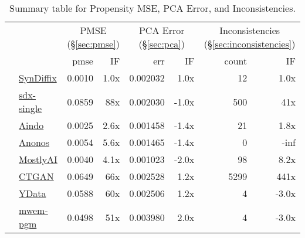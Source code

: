 \begin{table}
    \centering
    \caption{Summary table for Propensity MSE, PCA Error, and Inconsistencies.}
    \label{tab:pmse}
    \small
    \begin{tabular}{llr@{\hskip 6pt}r@{\hskip 14pt}r@{\hskip 6pt}r@{\hskip 14pt}rr}
        \toprule
          &   & \multicolumn{2}{c}{PMSE (\S\ref{sec:pmse})} & \multicolumn{2}{c}{PCA Error (\S\ref{sec:pca})} & \multicolumn{2}{c}{Inconsistencies (\S\ref{sec:inconsistencies})} \\
        
 & & pmse & IF & err & IF & count & IF \\
\midrule
        \cellcolor{blue} & \href{https://htmlpreview.github.io/?https://github.com/yoid2000/sdnist-summary/blob/main/results/syndiffix_all/report.html}{SynDiffix} & 0.0010 & 1.0x & 0.002032 & 1.0x & 12 & 1.0x \\
        \cellcolor{blue} & \href{https://htmlpreview.github.io/?https://github.com/yoid2000/sdnist-summary/blob/main/results/sdx_single/report.html}{sdx-single} & 0.0859 & 88x & 0.002030 & -1.0x & 500 & 41x \\
        \cellcolor{red} & \href{https://htmlpreview.github.io/?https://github.com/yoid2000/sdnist-summary/blob/main/results/aindo_synth/report.html}{Aindo} & 0.0025 & 2.6x & 0.001458 & -1.4x & 21 & 1.8x \\
        \cellcolor{red} & \href{https://htmlpreview.github.io/?https://github.com/yoid2000/sdnist-summary/blob/main/results/anonos_sdk/report.html}{Anonos} & 0.0054 & 5.6x & 0.001465 & -1.4x & 0 & -inf \\
        \cellcolor{red} & \href{https://htmlpreview.github.io/?https://github.com/yoid2000/sdnist-summary/blob/main/results/mostlyai_sd_platform/report.html}{MostlyAI} & 0.0040 & 4.1x & 0.001023 & -2.0x & 98 & 8.2x \\
        \cellcolor{red} & \href{https://htmlpreview.github.io/?https://github.com/yoid2000/sdnist-summary/blob/main/results/sdv_ctgan_epochs1000/report.html}{CTGAN} & 0.0649 & 66x & 0.002528 & 1.2x & 5299 & 441x \\
        \cellcolor{pink} & \href{https://htmlpreview.github.io/?https://github.com/yoid2000/sdnist-summary/blob/main/results/ydata_fabric_synthesizers/report.html}{YData} & 0.0588 & 60x & 0.002506 & 1.2x & 4 & -3.0x \\
        \cellcolor{ForestGreen} & \href{https://htmlpreview.github.io/?https://github.com/yoid2000/sdnist-summary/blob/main/results/mwem_pgm/report.html}{mwem-pgm} & 0.0498 & 51x & 0.003980 & 2.0x & 4 & -3.0x \\

\end{tabular}
\end{table}

